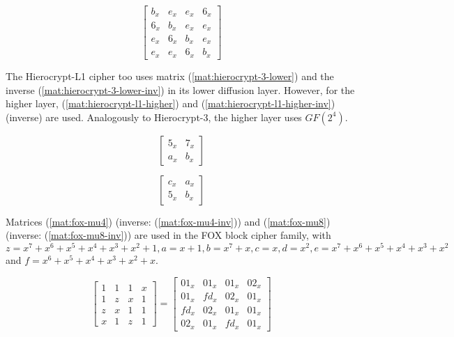 \begin{equation}\label{mat:hierocrypt-3-higher-inv}
\begin{bmatrix}
b_x & e_x & e_x & 6_x\\
6_x & b_x & e_x & e_x\\
e_x & 6_x & b_x & e_x\\
e_x & e_x & 6_x & b_x
\end{bmatrix}
\end{equation}

The Hierocrypt-L1 cipher too uses matrix (\ref{mat:hierocrypt-3-lower}) and the inverse (\ref{mat:hierocrypt-3-lower-inv}) in its lower diffusion layer. However, for the higher layer, (\ref{mat:hierocrypt-l1-higher}) and (\ref{mat:hierocrypt-l1-higher-inv}) (inverse) are used. Analogously to Hierocrypt-3, the higher layer uses $GF(2^4)$.

\begin{equation}\label{mat:hierocrypt-l1-higher}
\begin{bmatrix}
5_x & 7_x\\
a_x & b_x
\end{bmatrix}
\end{equation}

\begin{equation}\label{mat:hierocrypt-l1-higher-inv}
\begin{bmatrix}
c_x & a_x\\
5_x & b_x
\end{bmatrix}
\end{equation}

Matrices (\ref{mat:fox-mu4}) (inverse: (\ref{mat:fox-mu4-inv})) and (\ref{mat:fox-mu8}) (inverse: (\ref{mat:fox-mu8-inv})) are used in the FOX block cipher family, with $z = x^7+x^6+x^5+x^4+x^3+x^2+1, a = x+1, b = x^7+x, c = x, d = x^2, e = x^7+x^6+x^5+x^4+x^3+x^2$ and $f = x^6+x^5+x^4+x^3+x^2+x$.

\begin{equation}\label{mat:fox-mu4}
\begin{bmatrix}
1 & 1 & 1 & x\\
1 & z & x & 1\\
z & x & 1 & 1\\
x & 1 & z & 1
\end{bmatrix}
=
\begin{bmatrix}
01_x & 01_x & 01_x & 02_x\\
01_x & fd_x & 02_x & 01_x\\
fd_x & 02_x & 01_x & 01_x\\
02_x & 01_x & fd_x & 01_x
\end{bmatrix}
\end{equation}

